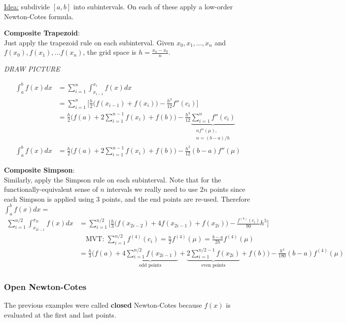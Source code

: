 \documentclass[12pt]{article}
\begin{document}
\underline{Idea:} subdivide $[a,b]$ into subintervals. On each of these apply a low-order Newton-Cotes formula.

\textbf{Composite Trapezoid}:\\
Just apply the trapezoid rule on each subinterval. Given $x_0, x_1, \dots, x_n$ and $f(x_0), f(x_1), \dots f(x_n)$, the grid space is $h = \frac{x_n-x_0}{n}$.

\textit{DRAW PICTURE}

\begin{align*}
\int_{a}^{b} f(x)dx &= \sum_{i=1}^n \int_{x_{i-1}}^{x_i} f(x)dx\\
&= \sum_{i=1}^n \bigl[ \frac{h}{2}\bigl(f(x_{i-1}) + f(x_i)\bigr) - \frac{h^3}{12}f''(c_i) \bigr] \\
&= \frac{h}{2}\bigl(f(a) + 2\sum_{i=1}^{n-1}f(x_i) + f(b)\bigr) - \frac{h^3}{12} \underbrace{\sum_{i=1}^n f''(c_i)}_{\substack{n f''(\mu),\\ n = (b-a)/h}}\\
%
\int_{a}^{b} f(x)dx &= \boxed{\frac{h}{2}\bigl(f(a) + 2\sum_{i=1}^{n-1}f(x_i) + f(b)\bigr) - \frac{h^2}{12}(b-a)f''(\mu) }
\end{align*}
 
\textbf{Composite Simpson}:\\
Similarly, apply the Simpson rule on each subinterval. Note that for the functionally-equivalent sense of $n$ intervals we really need to use $2n$ points since each Simpson is applied using 3 points, and the end points are re-used. Therefore $\int_{a}^{b} f(x)dx = $
%
\begin{align*}
\sum_{i=1}^{n/2}\int_{x_{2i-1}}^{x_{2i}} f(x)dx &= \sum_{i=1}^{n/2} \bigl[ \frac{h}{3}\bigl(f(x_{2i-2}) + 4f(x_{2i-1}) + f(x_{2i})\bigr) - \frac{f^{(4)}(c_i)}{90}h^5 \bigr]\\
&\quad \text{MVT: } \sum_{i=1}^{n/2}f^{(4)}(c_i) = \frac{n}{2}f^{(4)}(\mu) = \frac{b-a}{2h}f^{(4)}(\mu)\\
&= \frac{h}{3}\bigl(f(a) + \underbrace{4\sum_{i=1}^{n/2} f(x_{2i-1})}_{\text{odd points}} + \underbrace{2\sum_{i=1}^{n/2-1} f(x_{2i})}_{\text{even points}} + f(b)\bigr) - \frac{h^4}{180}(b-a)f^{(4)}(\mu)
\end{align*}


\subsubsection*{Open Newton-Cotes}
The previous examples were called \textbf{closed} Newton-Cotes because $f(x)$ is evaluated at the first and last points.
\end{document}
